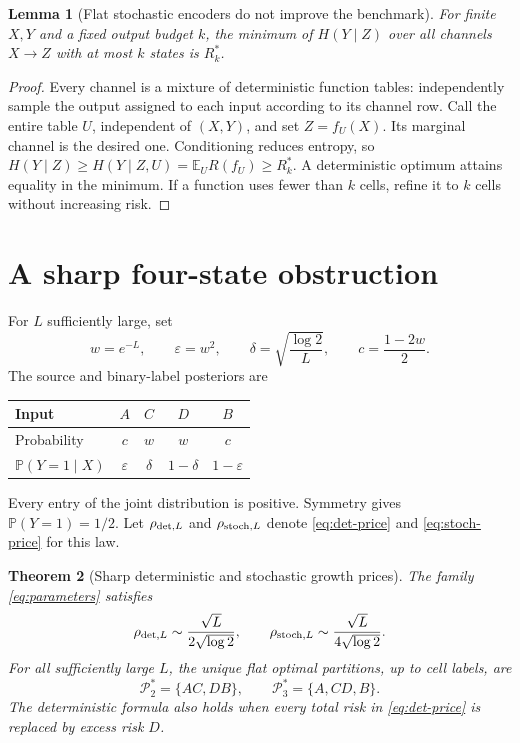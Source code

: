 \documentclass[11pt]{article}
\newtheorem{theorem}{Theorem}[section]
\newtheorem{lemma}[theorem]{Lemma}
\theoremstyle{remark}\newtheorem{remark}[theorem]{Remark}
\newcommand{\E}{\mathbb E}
\newcommand{\Prob}{\mathbb P}
\newcommand{\cP}{\mathcal P}
\begin{document}
\begin{lemma}[Flat stochastic encoders do not improve the benchmark]
\label{lem:flat}
For finite $X,Y$ and a fixed output budget $k$, the minimum of
$H(Y\mid Z)$ over all channels $X\to Z$ with at most $k$ states is
$R_k^*$.
\end{lemma}
\begin{proof}
Every channel is a mixture of deterministic function tables: independently
sample the output assigned to each input according to its channel row.
Call the entire table $U$, independent of $(X,Y)$, and set $Z=f_U(X)$.
Its marginal channel is the desired one. Conditioning reduces entropy, so
$H(Y\mid Z)\ge H(Y\mid Z,U)=\E_U R(f_U)\ge R_k^*$.
A deterministic optimum attains equality in the minimum. If a function uses
fewer than $k$ cells, refine it to $k$ cells without increasing risk.
\end{proof}

\section{A sharp four-state obstruction}
For $L$ sufficiently large, set
\begin{equation}
 w=e^{-L},\qquad \varepsilon=w^2,\qquad
 \delta=\sqrt{\frac{\log2}{L}},\qquad c=\frac{1-2w}{2}.
 \label{eq:parameters}
\end{equation}
The source and binary-label posteriors are
\begin{center}
\begin{tabular}{lcccc}\toprule
Input & $A$ & $C$ & $D$ & $B$\\\midrule
Probability & $c$ & $w$ & $w$ & $c$\\
$\Prob(Y=1\mid X)$ & $\varepsilon$ & $\delta$ & $1-\delta$ & $1-\varepsilon$\\\bottomrule
\end{tabular}
\end{center}
Every entry of the joint distribution is positive. Symmetry gives
$\Prob(Y=1)=1/2$. Let $\rho_{{\rm det},L}$ and
$\rho_{{\rm stoch},L}$ denote \eqref{eq:det-price} and
\eqref{eq:stoch-price} for this law.

\begin{theorem}[Sharp deterministic and stochastic growth prices]
\label{thm:main}
The family \eqref{eq:parameters} satisfies
\begin{equation}
 \rho_{{\rm det},L}\sim\frac{\sqrt L}{2\sqrt{\log2}},
 \qquad
 \rho_{{\rm stoch},L}\sim\frac{\sqrt L}{4\sqrt{\log2}}.
 \label{eq:main}
\end{equation}
For all sufficiently large $L$, the unique flat optimal partitions, up to
cell labels, are
\[
 \cP_2^*=\{AC,DB\},\qquad \cP_3^*=\{A,CD,B\}.
\]
The deterministic formula also holds when every total risk in
\eqref{eq:det-price} is replaced by excess risk $D$.
\end{theorem}
\end{document}
